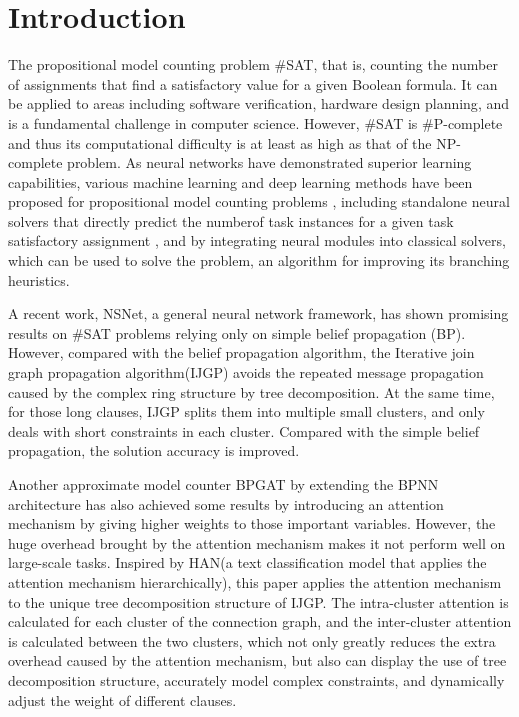 \section{Introduction}
The propositional model counting problem \#SAT, that is, counting the number of assignments 
that find a satisfactory value for a given Boolean formula. It can be applied to areas including
software verification\cite{DBLP:journals/fmsd/ClarkeBRZ01}\cite{DBLP:journals/tcs/IvancicYGGA08}, 
hardware design planning\cite{DBLP:conf/dac/SilvaS00}\cite{DBLP:conf/fmcad/SheeranSS00}\cite{DBLP:conf/aips/DomshlakH06}, 
and is a fundamental challenge in computer science. However, \#SAT is \#P-complete and thus its 
computational difficulty is at least as high as that of the NP-complete problem. As neural networks
have demonstrated superior learning capabilities, various machine learning and deep learning methods 
have been proposed for propositional model counting problems\cite{DBLP:conf/aaai/VaezipoorLWMGSB21}
\cite{Atkari_2019_10}\cite{DBLP:conf/ijcnn/OzolinsFDGZK22}, including standalone neural solvers that 
directly predict the numberof task instances for a given task satisfactory assignment \cite{DBLP:conf/iclr/AmizadehMW19}
\cite{DBLP:journals/corr/abs-1903-01969}, and by integrating neural modules into classical solvers, 
which can be used to solve the problem, an algorithm for improving its branching heuristics.

A recent work, NSNet\cite{DBLP:conf/nips/LiS22}, a general neural network framework, has shown promising 
results on \#SAT problems relying only on simple belief propagation (BP). However, compared with the belief 
propagation algorithm, the Iterative join graph propagation algorithm(IJGP)\cite{DBLP:journals/corr/abs-1301-0564} 
avoids the repeated message propagation caused by the complex ring structure by tree decomposition. At the 
same time, for those long clauses, IJGP splits them into multiple small clusters, and only deals with short 
constraints in each cluster. Compared with the simple belief propagation, the solution accuracy is improved.

Another approximate model counter BPGAT\cite{DBLP:conf/esann/Saveri22} by extending the BPNN\cite{DBLP:conf/nips/KuckCTLSSE20} 
architecture has also achieved some results by introducing an attention mechanism by giving higher weights 
to those important variables. However, the huge overhead brought by the attention mechanism makes it not 
perform well on large-scale tasks. Inspired by HAN\cite{DBLP:conf/naacl/YangYDHSH16}(a text classification 
model that applies the attention mechanism hierarchically), this paper applies the attention mechanism to the 
unique tree decomposition structure of IJGP. The intra-cluster attention is calculated for each cluster of 
the connection graph, and the inter-cluster attention is calculated between the two clusters, which not only 
greatly reduces the extra overhead caused by the attention mechanism, but also can display the use of tree 
decomposition structure, accurately model complex constraints, and dynamically adjust the weight of different 
clauses.

